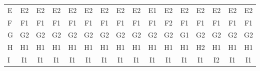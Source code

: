 \documentclass[twoside]{article}
\newenvironment{answer}{}{\medskip}
\begin{document}
\begin{answer}
\begin{table}[h]
\begin{latin}
\begin{tabular}{lccccccccccccccc}
E & E2                                & E2                               & E2                               & E2                               & E2                               & E2                               & E2                               & E2                               & E1                               & E2                               & E2                                & E2                                & E2                                & E2                                & E2                                \\
F & F1                                & F1                               & F1                               & F1                               & F1                               & F1                               & F1                               & F1                               & F1                               & F2                               & F1                                & F1                                & F1                                & F1                                & F1                                \\
G & G2                                & G2                               & G2                               & G2                               & G2                               & G2                               & G2                               & G2                               & G2                               & G2                               & G1                                & G2                                & G2                                & G2                                & G2                                \\
H & H1                                & H1                               & H1                               & H1                               & H1                               & H1                               & H1                               & H1                               & H1                               & H1                               & H1                                & H2                                & H1                                & H1                                & H1                                \\
I & I1                                & I1                               & I1                               & I1                               & I1                               & I1                               & I1                               & I1                               & I1                               & I1                               & I1                                & I1                                & I2                                & I1                                & I1                                \\

\end{tabular}
\end{latin}
\end{table}
\end{answer}
\end{document}

